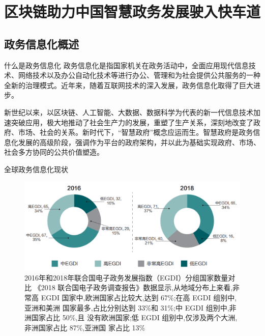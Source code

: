 \documentclass[11pt]{beamer}
\begin{document}
\section{区块链助力中国智慧政务发展驶入快车道}

\subsection{政务信息化概述}
\begin{frame}{什么是政务信息化}
	政务信息化是指国家机关在政务活动中，全面应用现代信息技术、网络技术以及办公自动化技术等进行办公、管理和为社会提供公共服务的一种全新的治理模式。近年来，随着互联网技术的深入发展，政务信息化取得了巨大进步。

	新世纪以来，以区块链、人工智能、大数据、数据科学为代表的新一代信息技术加速突破应用，极大地推动了社会生产力的发展，重塑了生产关系，深刻地改变了政府、市场、社会的关系。新时代下，“智慧政府”概念应运而生。智慧政府是政务信息化发展的高级阶段，强调作为平台的政府架构，并以此为基础实现政府、市场、社会多方协同的公共价值塑造。
\end{frame}

\begin{frame}{全球政务信息化现状}
	\begin{figure}
		\centering
		\includegraphics[width=0.9\linewidth]{figures/gov/1}
		\caption{2016年和2018年联合国电子政务发展指数（EGDI）分组国家数量对比
		{\tiny 《2018 联合国电子政务调查报告》数据显示,从地域分布上来看,非常高
		EGDI 国家中,欧洲国家占比较大,达到 67\%;在高 EGDI 组别中,亚洲和美洲
		国家最多,占比分别达到 33\%和 31\%;中 EGDI 组别中,非洲国家占比 50\%,且
		没有欧洲国家;低 EGDI 组别中,仅涉及两个大洲,非洲国家占比 87\%,亚洲国
		家占比 13\%}}
		\label{fig:1}
	\end{figure}
\end{frame}
\end{document}
